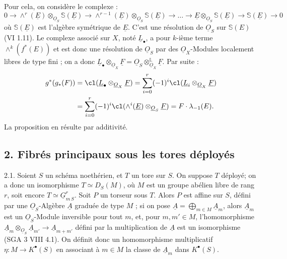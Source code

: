 
Pour cela, on considère le complexe :
\[
0\longrightarrow \wedge^r(\underline{E})\otimes_{\underline{O}_S}\mathbb S(\underline{E})\longrightarrow
\wedge^{r-1}(\underline{E})\otimes_{\underline{O}_S}\mathbb S(\underline{E})\longrightarrow\ldots\longrightarrow
\underline{E}\otimes_{\underline{O}_S}\mathbb S(\underline{E})\longrightarrow \mathbb S(\underline{E})\longrightarrow 0
\]
où $\mathbb S(\underline{E})$ est l'algèbre symétrique de $\underline{E}$. C'est une résolution de $\underline{O}_S$ sur $\mathbb S(E)$ (VI 1.11). Le complexe associé sur $X$, noté $\underline{L}_\bullet$, a pour $k$-ième terme $\wedge^k(f^*(E))$ et est donc une résolution de $\underline{O}_S$ par des $\underline{O}_X$-Modules localement libres de type fini ; on a donc \(\underline{L}_\bullet\otimes_{\underline{O}_X}\underline{F}=\underline{O}_S\otimes^{\mathbb L}_{\underline{O}_X}\underline{F}\). Par suite :
\[
\begin{aligned}
g^*(g_*(F))
&=\cl(\underline{L}_\bullet\otimes_{\underline{O}_X}\underline{F})
=\sum_{i=0}^r(-1)^i\cl(\underline{L}_i\otimes_{\underline{O}_X}\underline{F})\\
&=\sum_{i=0}^r(-1)^i\cl(\wedge^i(\underline{E})\otimes_{\underline{O}_S}\underline{F})
=F\cdot\lambda_{-1}(E).
\end{aligned}
\]
La proposition en résulte par additivité.

\subsection*{2. Fibrés principaux sous les tores déployés}

2.1. Soient $S$ un schéma noethérien, et $T$ un tore sur $S$. On suppose $T$ déployé; on a donc un isomorphisme $T\simeq D_S(M)$, où $M$ est un groupe abélien libre de rang $r$, soit encore $T\simeq \underline{G}_{m\,S}^r$. Soit $P$ un torseur sous $T$. Alors $P$ est affine sur $S$, défini par une $\underline{O}_S$-Algèbre $\underline{A}$ graduée de type $M$ ; si on pose $\underline{A}=\bigoplus_{m\in M}\underline{A}_m$, alors $\underline{A}_m$ est un $\underline{O}_S$-Module inversible pour tout $m$, et, pour $m,m'\in M$, l'homomorphisme $\underline{A}_m\otimes_{\underline{O}_S}\underline{A}_{m'}\longrightarrow \underline{A}_{m+m'}$ défini par la multiplication de $\underline{A}$ est un isomorphisme (SGA 3 VIII 4.1). On définit donc un homomorphisme multiplicatif $\eta:M\longrightarrow K^{\bullet}(S)$ en associant à $m\in M$ la classe de $\underline{A}_m$ dans $K^{\bullet}(S)$.

